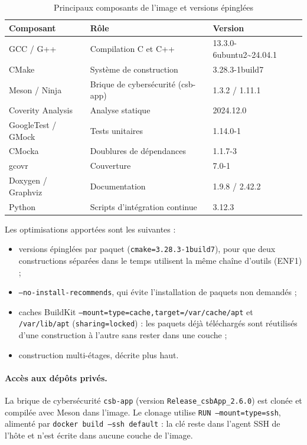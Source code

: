 \begin{table}[H]
\centering
\caption{Principaux composants de l'image et versions épinglées}
\label{tab:impl-image-versions}
\small
\begin{tabularx}{\textwidth}{@{}l X l@{}}
\toprule
\textbf{Composant} & \textbf{Rôle} & \textbf{Version} \\
\midrule
GCC / G++ & Compilation C et C++ & 13.3.0-6ubuntu2\textasciitilde 24.04.1 \\
CMake & Système de construction & 3.28.3-1build7 \\
Meson / Ninja & Brique de cybersécurité (csb-app) & 1.3.2 / 1.11.1 \\
Coverity Analysis & Analyse statique & 2024.12.0 \\
GoogleTest / GMock & Tests unitaires & 1.14.0-1 \\
CMocka & Doublures de dépendances & 1.1.7-3 \\
gcovr & Couverture & 7.0-1 \\
Doxygen / Graphviz & Documentation & 1.9.8 / 2.42.2 \\
Python & Scripts d'intégration continue & 3.12.3 \\
\bottomrule
\end{tabularx}
\end{table}

Les optimisations apportées sont les suivantes :

\begin{itemize}[nosep]
  \item versions épinglées par paquet (\texttt{cmake=3.28.3-1build7}), pour que deux
        constructions séparées dans le temps utilisent la même chaîne d'outils (ENF1) ;
  \item \texttt{--no-install-recommends}, qui évite l'installation de paquets non demandés ;
  \item caches BuildKit \texttt{--mount=type=cache,target=/var/cache/apt} et
        \texttt{/var/lib/apt} (\texttt{sharing=locked}) : les paquets déjà téléchargés
        sont réutilisés d'une construction à l'autre sans rester dans une couche ;
  \item construction multi-étages, décrite plus haut.
\end{itemize}

\paragraph{Accès aux dépôts privés.} La brique de cybersécurité \texttt{csb-app}
(version \texttt{Release\_csbApp\_2.6.0}) est clonée et compilée avec Meson dans
l'image. Le clonage utilise \texttt{RUN --mount=type=ssh}, alimenté par
\texttt{docker build --ssh default} : la clé reste dans l'agent SSH de l'hôte et
n'est écrite dans aucune couche de l'image.

